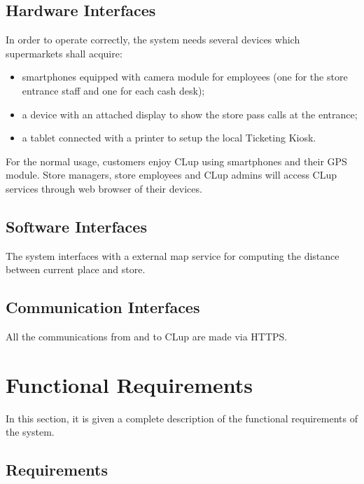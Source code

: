 \clearpage

\subsection{Hardware Interfaces}
In order to operate correctly, the system needs several devices which supermarkets shall acquire:
\begin{itemize}
	\item smartphones equipped with camera module for employees (one for the store entrance staff and one for each cash desk);
	\item a device with an attached display to show the store pass calls at the entrance;
	\item a tablet connected with a printer to setup the local Ticketing Kiosk.
\end{itemize}

For the normal usage, customers enjoy CLup using smartphones and their GPS module.
Store managers, store employees and CLup admins will access CLup services through web browser of their devices.

\subsection{Software Interfaces}
The system interfaces with a external map service for computing the distance between current place and store.

\subsection{Communication Interfaces}
All the communications from and to CLup are made via HTTPS.

\section{Functional Requirements}
In this section, it is given a complete description of the functional requirements of the system.

    \subsection{Requirements}
